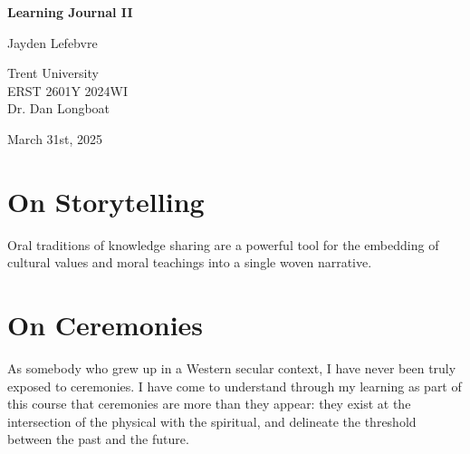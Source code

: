 \documentclass{report}
\begin{document}
\begin{titlepage}
    \begin{center}
        \vspace*{1.2cm}

        \textbf{Learning Journal II}

        \vspace{2cm}

        Jayden Lefebvre\\

        \vspace{5cm}
        
        Trent University\\
        ERST 2601Y 2024WI\\
        Dr. Dan Longboat\\

        \vfill

        March 31st, 2025
        
    \end{center}
\end{titlepage}

\thispagestyle{plain}
\tableofcontents

\clearpage

\section{On Storytelling}

\hspace{24pt} Oral traditions of knowledge sharing are a powerful tool for the embedding of cultural values and moral teachings into a single woven narrative.






% 

\clearpage

\section{On Ceremonies}

\hspace{24pt} As somebody who grew up in a Western secular context, I have never been truly exposed to ceremonies. I have come to understand through my learning as part of this course that ceremonies are more than they appear: they exist at the intersection of the physical with the spiritual, and delineate the threshold between the past and the future.
\end{document}
